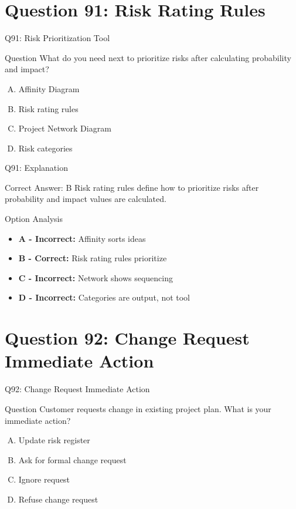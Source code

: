 \documentclass{beamer}
\begin{document}
	\section{Question 91: Risk Rating Rules}
	
	\begin{frame}{Q91: Risk Prioritization Tool}
		\begin{block}{Question}
			What do you need next to prioritize risks after calculating probability and impact?
		\end{block}
		\begin{enumerate}[(A)]
			\item Affinity Diagram
			\item Risk rating rules
			\item Project Network Diagram
			\item Risk categories
		\end{enumerate}
	\end{frame}
	
	\begin{frame}{Q91: Explanation}
		\begin{block}{Correct Answer: B}
			Risk rating rules define how to prioritize risks after probability and impact values are calculated.
		\end{block}
		\begin{block}{Option Analysis}
			\begin{itemize}
				\item \textbf{A - Incorrect:} Affinity sorts ideas
				\item \textbf{B - Correct:} Risk rating rules prioritize
				\item \textbf{C - Incorrect:} Network shows sequencing
				\item \textbf{D - Incorrect:} Categories are output, not tool
			\end{itemize}
		\end{block}
	\end{frame}
	
	\section{Question 92: Change Request Immediate Action}
	
	\begin{frame}{Q92: Change Request Immediate Action}
		\begin{block}{Question}
			Customer requests change in existing project plan. What is your immediate action?
		\end{block}
		\begin{enumerate}[(A)]
			\item Update risk register
			\item Ask for formal change request
			\item Ignore request
			\item Refuse change request
		\end{enumerate}
	\end{frame}
	
\end{document}
